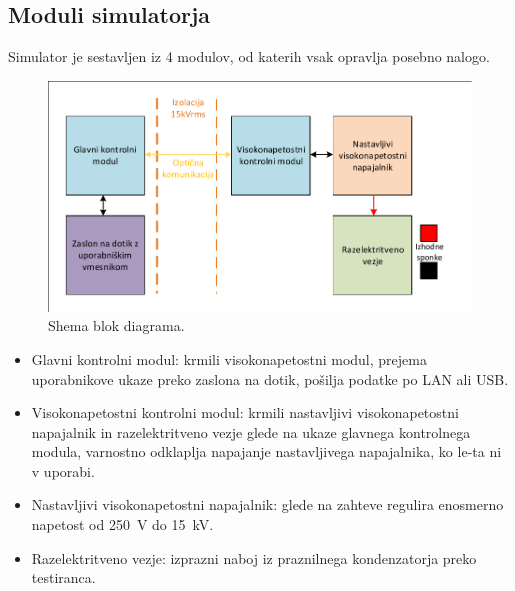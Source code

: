 \documentclass[a4paper,twoside,openright,12pt,Slovene]{book}
\begin{document}
	\subsection{Moduli simulatorja}
	Simulator je sestavljen iz 4 modulov, od katerih vsak opravlja posebno nalogo.
	\begin{figure}[h]
    \centering
    \includegraphics[width=1\columnwidth]{Sheme/Osnovna blok shema poenostavljena.pdf}
    \caption{\label{BlokDiagramShema} Shema blok diagrama.}
	\end{figure}
	
	\begin{itemize}
		\item Glavni kontrolni modul: krmili visokonapetostni modul, prejema uporabnikove ukaze preko zaslona na dotik, pošilja podatke po LAN ali USB.
		\item Visokonapetostni kontrolni modul: krmili nastavljivi visokonapetostni napajalnik in razelektritveno vezje glede na ukaze glavnega kontrolnega modula, varnostno odklaplja napajanje nastavljivega napajalnika, ko le-ta ni v uporabi.
		\item Nastavljivi visokonapetostni napajalnik: glede na zahteve regulira enosmerno napetost od \SI{250}{\volt} do \SI{15}{\kilo\volt}.
		\item Razelektritveno vezje: izprazni naboj iz praznilnega kondenzatorja preko testiranca.
	\end{itemize}
\end{document}
